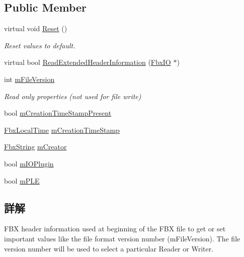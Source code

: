 \subsection*{Public Member}
\begin{DoxyCompactItemize}
\item 
virtual void \hyperlink{class_fbx_i_o_file_header_info_aeed179cd3c2f85990eb5f7659a30ae9d}{Reset} ()
\begin{DoxyCompactList}\small\item\em Reset values to default. \end{DoxyCompactList}\item 
virtual bool \hyperlink{class_fbx_i_o_file_header_info_a8ad5d787f5d5daf0155b0717ceb3e230}{Read\+Extended\+Header\+Information} (\hyperlink{class_fbx_i_o}{Fbx\+IO} $\ast$)
\end{DoxyCompactItemize}
\begin{DoxyCompactItemize}
\item 
int \hyperlink{class_fbx_i_o_file_header_info_ab344842c3191b6082e271c6768fe0eb6}{m\+File\+Version}
\begin{DoxyCompactList}\small\item\em Read only properties (not used for file write) \end{DoxyCompactList}\item 
bool \hyperlink{class_fbx_i_o_file_header_info_aa0db0af8bd4add4117e6da9e86b915d2}{m\+Creation\+Time\+Stamp\+Present}
\item 
\hyperlink{class_fbx_local_time}{Fbx\+Local\+Time} \hyperlink{class_fbx_i_o_file_header_info_a48645d8ae722ebfeb290b8c1d7e6cac7}{m\+Creation\+Time\+Stamp}
\item 
\hyperlink{class_fbx_string}{Fbx\+String} \hyperlink{class_fbx_i_o_file_header_info_ac612921a3f7e36b79fb017242ae5fe5c}{m\+Creator}
\item 
bool \hyperlink{class_fbx_i_o_file_header_info_a76db06e54a4c3fbc382e630271d5e853}{m\+I\+O\+Plugin}
\item 
bool \hyperlink{class_fbx_i_o_file_header_info_a831142b96de2fe8c3da6009c4f596f5c}{m\+P\+LE}
\end{DoxyCompactItemize}


\subsection{詳解}
F\+BX header information used at beginning of the F\+BX file to get or set important values like the file format version number (m\+File\+Version). The file version number will be used to select a particular Reader or Writer. 

